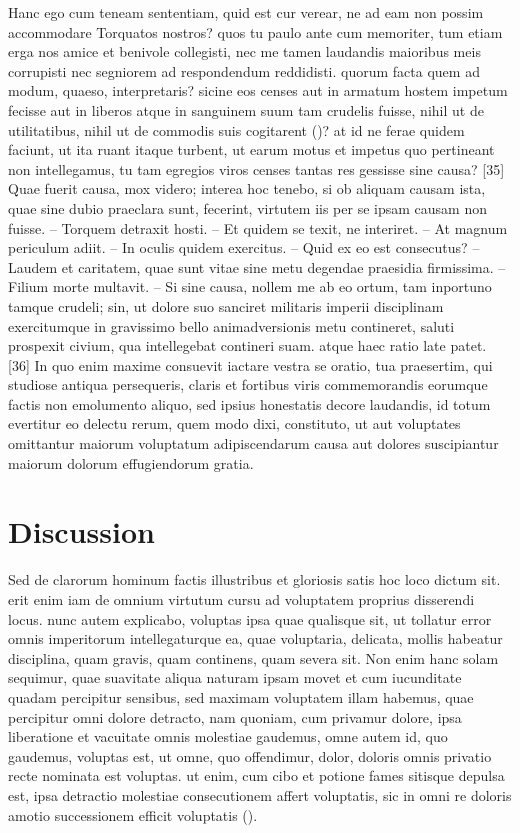 \documentclass[a4paper,12pt]{article}
\begin{document}
Hanc ego cum teneam sententiam, quid est cur verear, ne ad eam non possim accommodare
Torquatos nostros? quos tu paulo ante cum memoriter, tum etiam erga nos amice et benivole
collegisti, nec me tamen laudandis maioribus meis corrupisti nec segniorem ad respondendum
reddidisti. quorum facta quem ad modum, quaeso, interpretaris? sicine eos censes aut in
armatum hostem impetum fecisse aut in liberos atque in sanguinem suum tam crudelis fuisse,
nihil ut de utilitatibus, nihil ut de commodis suis cogitarent ()?
at id ne ferae quidem faciunt, ut ita ruant itaque turbent, ut earum motus et impetus quo
pertineant non intellegamus, tu tam egregios viros censes tantas res gessisse sine causa?
[35] Quae fuerit causa, mox videro; interea hoc tenebo, si ob aliquam causam ista, quae
sine dubio praeclara sunt, fecerint, virtutem iis per se ipsam causam non fuisse. --
Torquem detraxit hosti. -- Et quidem se texit, ne interiret. -- At magnum periculum
adiit. -- In oculis quidem exercitus. -- Quid ex eo est consecutus? -- Laudem et
caritatem, quae sunt vitae sine metu degendae praesidia firmissima. -- Filium morte
multavit. -- Si sine causa, nollem me ab eo ortum, tam inportuno tamque crudeli; sin, ut
dolore suo sanciret militaris imperii disciplinam exercitumque in gravissimo bello
animadversionis metu contineret, saluti prospexit civium, qua intellegebat contineri
suam. atque haec ratio late patet. [36] In quo enim maxime consuevit iactare vestra se
oratio, tua praesertim, qui studiose antiqua persequeris, claris et fortibus viris
commemorandis eorumque factis non emolumento aliquo, sed ipsius honestatis decore
laudandis, id totum evertitur eo delectu rerum, quem modo dixi, constituto, ut aut
voluptates omittantur maiorum voluptatum adipiscendarum causa aut dolores suscipiantur
maiorum dolorum effugiendorum gratia.


\section*{Discussion}

Sed de clarorum hominum factis illustribus et gloriosis satis hoc loco dictum sit. erit
enim iam de omnium virtutum cursu ad voluptatem proprius disserendi locus. nunc autem
explicabo, voluptas ipsa quae qualisque sit, ut tollatur error omnis imperitorum
intellegaturque ea, quae voluptaria, delicata, mollis habeatur disciplina, quam gravis,
quam continens, quam severa sit. Non enim hanc solam sequimur, quae suavitate aliqua
naturam ipsam movet et cum iucunditate quadam percipitur sensibus, sed maximam voluptatem
illam habemus, quae percipitur omni dolore detracto, nam quoniam, cum privamur dolore,
ipsa liberatione et vacuitate omnis molestiae gaudemus, omne autem id, quo gaudemus,
voluptas est, ut omne, quo offendimur, dolor, doloris omnis privatio recte nominata est
voluptas. ut enim, cum cibo et potione fames sitisque depulsa est, ipsa detractio
molestiae consecutionem affert voluptatis, sic in omni re doloris amotio successionem
efficit voluptatis (). 
\end{document}

